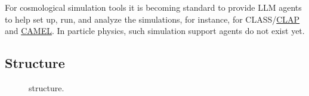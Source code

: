\documentclass[submission, Phys]{SciPost}
\begin{document}
For cosmological simulation tools it is becoming standard to provide LLM agents to help set up, run, and analyze the simulations, for instance, for CLASS/\href{https://github.com/santiagocasas/clapp/}{CLAP} and \href{https://github.com/franciscovillaescusa/CAMELS_Agents/}{CAMEL}. In particle physics, such simulation support agents do not exist yet.

\subsection{Structure}

\begin{figure}[b!]
  \centering
  
  \caption{\ma structure.}
  \label{fig:madagents-overview}
\end{figure}
\end{document}
